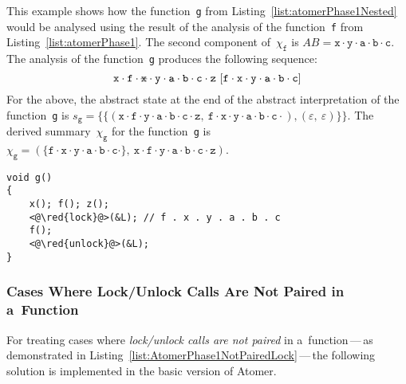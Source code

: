 \begin{example}
    This example shows how the function~\texttt{g} from Listing~\ref{list:atomerPhase1Nested} would be analysed using the result of the analysis of the function~\texttt{f} from Listing~\ref{list:atomerPhase1}. The second component of~$ \chi_\mathtt{f} $ is $ AB = \mathtt{x} \cdot \mathtt{y} \cdot \mathtt{a} \cdot \mathtt{b} \cdot \mathtt{c} $. The analysis of the function~\texttt{g} produces the following sequence:
    $$
        \mathtt{x} \cdot \mathtt{f} \cdot \text{\texttt{\sout{x}}} \cdot \mathtt{y} \cdot \mathtt{a} \cdot \mathtt{b} \cdot \mathtt{c} \cdot \mathtt{z}\ [\mathtt{f} \cdot \mathtt{x} \cdot \mathtt{y} \cdot \mathtt{a} \cdot \mathtt{b} \cdot \mathtt{c}]
    $$
    For the above, the abstract state at the end of the abstract interpretation of the function~\texttt{g} is $ s_\mathtt{g} = \{\{(\mathtt{x} \cdot \mathtt{f} \cdot \mathtt{y} \cdot \mathtt{a} \cdot \mathtt{b} \cdot \mathtt{c} \cdot \mathtt{z},\ \mathtt{f} \cdot \mathtt{x} \cdot \mathtt{y} \cdot \mathtt{a} \cdot \mathtt{b} \cdot \mathtt{c} \cdot), (\varepsilon,\ \varepsilon)\}\} $. The derived summary~$ \chi_\mathtt{g} $ for the function~\texttt{g} is $ \chi_\mathtt{g} = (\{\mathtt{f} \cdot \mathtt{x} \cdot \mathtt{y} \cdot \mathtt{a} \cdot \mathtt{b} \cdot \mathtt{c} \cdot\},\ \mathtt{x} \cdot \mathtt{f} \cdot \mathtt{y} \cdot \mathtt{a} \cdot \mathtt{b} \cdot \mathtt{c} \cdot \mathtt{z}) $.
\end{example}

\begin{lstlisting}[style=c, label={list:atomerPhase1Nested}, float=hbt, caption={A~code snippet used to illustrate the derivation of sequences of functions called atomically with a~\emph{nested function call} (function~\texttt{f} is defined in Listing~\ref{list:atomerPhase1})}]
void g()
{
    x(); f(); z();
    <@\red{lock}@>(&L); // f . x . y . a . b . c
    f();
    <@\red{unlock}@>(&L);
}
\end{lstlisting}

\subsubsection{Cases Where Lock/Unlock Calls Are Not Paired in a~Function}

For treating cases where \emph{lock/unlock calls are not paired} in a~function\,---\,as demonstrated in Listing~\ref{list:AtomerPhase1NotPairedLock}\,---\,the following solution is implemented in the basic version of Atomer.

